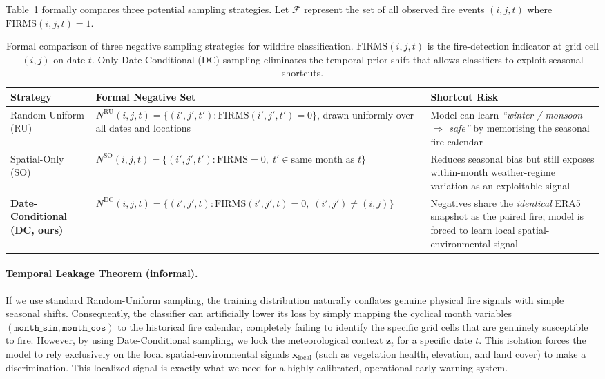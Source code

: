 Table~\ref{tab:sampling_strategies} formally compares three potential sampling strategies. Let $\mathcal{F}$ represent the set of all observed fire events $(i,j,t)$ where $\text{FIRMS}(i,j,t)=1$.

\begin{table}[H]
\centering
\setlength{\tabcolsep}{5pt}
\renewcommand{\arraystretch}{1.35}
\begin{tabular}{p{3.2cm}p{6.2cm}p{4.5cm}}
\toprule
\textbf{Strategy} & \textbf{Formal Negative Set} & \textbf{Shortcut Risk} \\
\midrule
Random Uniform (RU) &
  $N^{\text{RU}}(i,j,t) = \{(i',j',t') : \text{FIRMS}(i',j',t')=0\}$,
  drawn uniformly over all dates and locations &
  Model can learn \textit{``winter / monsoon $\Rightarrow$ safe''} by
  memorising the seasonal fire calendar \\
\midrule
Spatial-Only (SO) &
  $N^{\text{SO}}(i,j,t) = \{(i',j',t') : \text{FIRMS}=0,\;t'\in\text{same month as }t\}$ &
  Reduces seasonal bias but still exposes within-month weather-regime variation
  as an exploitable signal \\
\midrule
\textbf{Date-Conditional (DC, ours)} &
  $N^{\text{DC}}(i,j,t) = \{(i',j',t) : \text{FIRMS}(i',j',t)=0,\;(i',j')\neq(i,j)\}$ &
  Negatives share the \textit{identical} ERA5 snapshot as the paired fire;
  model is forced to learn local spatial-environmental signal \\
\bottomrule
\end{tabular}
\caption{Formal comparison of three negative sampling strategies for wildfire classification.
  $\text{FIRMS}(i,j,t)$ is the fire-detection indicator at grid cell $(i,j)$ on date $t$.
  Only Date-Conditional (DC) sampling eliminates the temporal prior shift that allows
  classifiers to exploit seasonal shortcuts.}
\label{tab:sampling_strategies}
\end{table}

\medskip
\paragraph{Temporal Leakage Theorem (informal).}
If we use standard Random-Uniform sampling, the training distribution naturally conflates genuine physical fire signals with simple seasonal shifts. Consequently, the classifier can artificially lower its loss by simply mapping the cyclical month variables $(\texttt{month\_sin},\texttt{month\_cos})$ to the historical fire calendar, completely failing to identify the specific grid cells that are genuinely susceptible to fire. However, by using Date-Conditional sampling, we lock the meteorological context $\mathbf{z}_t$ for a specific date $t$. This isolation forces the model to rely exclusively on the local spatial-environmental signals $\mathbf{x}_{\text{local}}$ (such as vegetation health, elevation, and land cover) to make a discrimination. This localized signal is exactly what we need for a highly calibrated, operational early-warning system.

